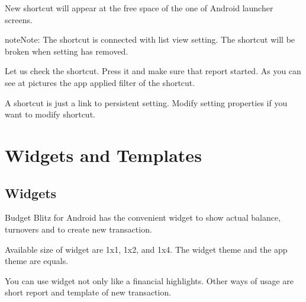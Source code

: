 \documentclass[a4paper,10pt,english]{sphinxmanual}
\begin{document}
\noindent{}
\noindent{}

\sphinxAtStartPar
New shortcut will appear at the free space of the one of Android launcher screens.

\begin{sphinxadmonition}{note}{Note:}
\sphinxAtStartPar
The shortcut is connected with list view setting. The shortcut will be broken when setting has removed.
\end{sphinxadmonition}

\noindent{}
\noindent{}
\noindent{}

\sphinxAtStartPar
Let us check the shortcut. Press it and make sure that report started. As you can see at pictures the app
applied filter of the shortcut.

\sphinxAtStartPar
A shortcut is just a link to persistent setting. Modify setting properties if you want to modify shortcut.

\sphinxstepscope


\chapter{Widgets and Templates}
\label{\detokenize{widgets:widgets-and-templates}}\label{\detokenize{widgets:chapter-widgets}}\label{\detokenize{widgets::doc}}

\section{Widgets}
\label{\detokenize{widgets:widgets}}
\sphinxAtStartPar
Budget Blitz for Android has the convenient widget to show actual balance, turnovers and to create new transaction.


\sphinxAtStartPar
Available size of widget are 1x1, 1x2, and 1x4. The widget theme and the app theme are equals.

\sphinxAtStartPar
You can use widget not only like a financial highlights. Other ways of usage are short report
and template of new transaction.
\end{document}
